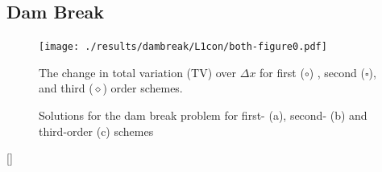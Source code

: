 \documentclass[SingleSpace,12pt]{Serre_ASCE}
\begin{document}
\subsection{Dam Break}
\begin{figure}[htb]
\begin{center}
\texttt{[image: ./results/dambreak/L1con/both-figure0.pdf]}
\end{center}
\caption{The change in total variation (TV) over $\Delta x$ for first ($\circ$) , second ($\square$), and third ($\diamond$) order schemes.}
\label{fig:DBL1}
\end{figure}
\begin{figure}[htb]
\centering
{}
\caption{Solutions for the dam break problem for first- (a), second- (b) and third-order (c) schemes}
\label{fig:DB}
\end{figure}[]
\end{document}
